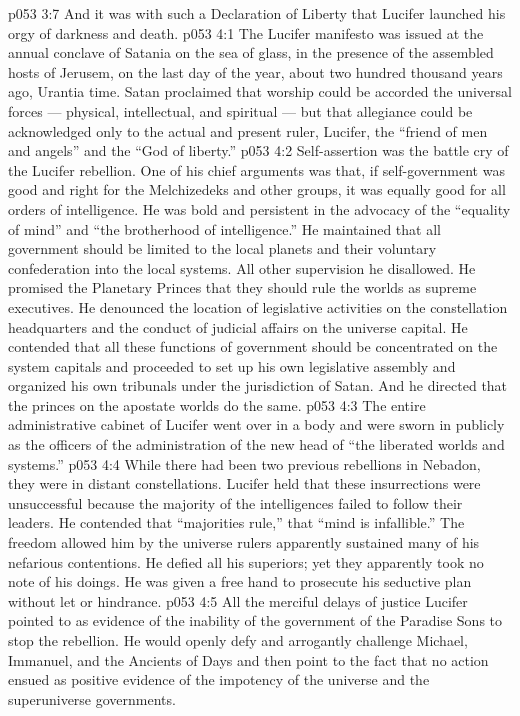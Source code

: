 \vs p053 3:7 \pc And it was with such a Declaration of Liberty that Lucifer launched his orgy of darkness and death.
\vs p053 4:1 The Lucifer manifesto was issued at the annual conclave of Satania on the sea of glass, in the presence of the assembled hosts of Jerusem, on the last day of the year, about two hundred thousand years ago, Urantia time. Satan proclaimed that worship could be accorded the universal forces --- physical, intellectual, and spiritual --- but that allegiance could be acknowledged only to the actual and present ruler, Lucifer, the “friend of men and angels” and the “God of liberty.”
\vs p053 4:2 Self\hyp{}assertion was the battle cry of the Lucifer rebellion. One of his chief arguments was that, if self\hyp{}government was good and right for the Melchizedeks and other groups, it was equally good for all orders of intelligence. He was bold and persistent in the advocacy of the “equality of mind” and “the brotherhood of intelligence.” He maintained that all government should be limited to the local planets and their voluntary confederation into the local systems. All other supervision he disallowed. He promised the Planetary Princes that they should rule the worlds as supreme executives. He denounced the location of legislative activities on the constellation headquarters and the conduct of judicial affairs on the universe capital. He contended that all these functions of government should be concentrated on the system capitals and proceeded to set up his own legislative assembly and organized his own tribunals under the jurisdiction of Satan. And he directed that the princes on the apostate worlds do the same.
\vs p053 4:3 The entire administrative cabinet of Lucifer went over in a body and were sworn in publicly as the officers of the administration of the new head of “the liberated worlds and systems.”
\vs p053 4:4 \pc While there had been two previous rebellions in Nebadon, they were in distant constellations. Lucifer held that these insurrections were unsuccessful because the majority of the intelligences failed to follow their leaders. He contended that “majorities rule,” that “mind is infallible.” The freedom allowed him by the universe rulers apparently sustained many of his nefarious contentions. He defied all his superiors; yet they apparently took no note of his doings. He was given a free hand to prosecute his seductive plan without let or hindrance.
\vs p053 4:5 \pc All the merciful delays of justice Lucifer pointed to as evidence of the inability of the government of the Paradise Sons to stop the rebellion. He would openly defy and arrogantly challenge Michael, Immanuel, and the Ancients of Days and then point to the fact that no action ensued as positive evidence of the impotency of the universe and the superuniverse governments.

